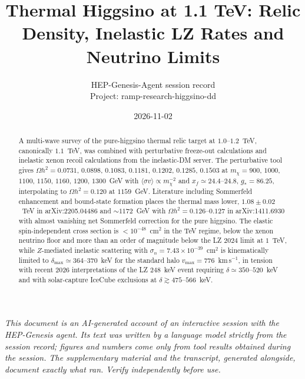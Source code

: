 \documentclass[11pt,a4paper]{article}
\title{Thermal Higgsino at 1.1 TeV: Relic Density, Inelastic LZ Rates and Neutrino Limits}
\author{HEP-Genesis-Agent session record \\ \small Project: ramp-research-higgsino-dd}
\date{2026-11-02}
\begin{document}
\maketitle
\noindent\textit{\small This document is an AI-generated account of an interactive session with the HEP-Genesis agent. Its text was written by a language model strictly from the session record; figures and numbers come only from tool results obtained during the session. The supplementary material and the transcript, generated alongside, document exactly what ran. Verify independently before use.}
\vspace{1em}

\begin{abstract}
A multi-wave survey of the pure-higgsino thermal relic target at $1.0$--$1.2$~TeV, canonically $1.1$~TeV, was combined with perturbative freeze-out calculations and inelastic xenon recoil calculations from the inelastic-DM server. The perturbative tool gives $\Omega h^{2}=0.0731$, $0.0898$, $0.1083$, $0.1181$, $0.1202$, $0.1285$, $0.1503$ at $m_{\chi}=900$, $1000$, $1100$, $1150$, $1160$, $1200$, $1300$~GeV with $\langle\sigma v\rangle\propto m_{\chi}^{-2}$ and $x_{f}\simeq24.4$--$24.8$, $g_{*}=86.25$, interpolating to $\Omega h^{2}=0.120$ at $1159$~GeV. Literature including Sommerfeld enhancement and bound-state formation places the thermal mass lower, $1.08\pm0.02$~TeV in arXiv:2205.04486 and $\sim1172$~GeV with $\Omega h^{2}=0.126$--$0.127$ in arXiv:1411.6930 with almost vanishing net Sommerfeld correction for the pure higgsino. The elastic spin-independent cross section is $<10^{-48}$~cm$^{2}$ in the TeV regime, below the xenon neutrino floor and more than an order of magnitude below the LZ 2024 limit at $1$~TeV, while $Z$-mediated inelastic scattering with $\sigma_{n}=7.43\times10^{-39}$~cm$^{2}$ is kinematically limited to $\delta_{\max}\simeq364$--$370$~keV for the standard halo $v_{\max}=776$~km\,s$^{-1}$, in tension with recent 2026 interpretations of the LZ $248$~keV event requiring $\delta\simeq350$--$520$~keV and with solar-capture IceCube exclusions at $\delta\gtrsim475$--$566$~keV.
\end{abstract}
\end{document}

